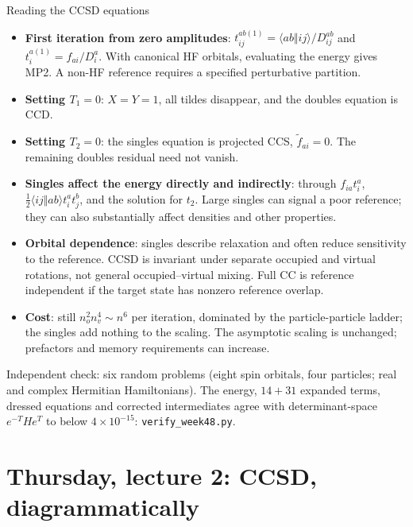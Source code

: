 \documentclass[aspectratio=169,10pt]{beamer}
\newcommand{\numbox}[1]{%
  \begin{tcolorbox}[colback=palegreen,colframe=teal!70!black,title={\bfseries Measured}]
  #1
  \end{tcolorbox}}
\newcommand{\as}[4]{\langle #1#2\Vert #3#4\rangle}
\newcommand{\ft}{\tilde f}
\begin{document}
\begin{frame}[shrink=10]{Reading the CCSD equations}
\small
\begin{itemize}
\item \textbf{First iteration from zero amplitudes}: $t_{ij}^{ab(1)}=\as abij/D_{ij}^{ab}$ and $t_i^{a(1)}=f_{ai}/D_i^a$. With canonical HF orbitals, evaluating the energy gives MP2. A non-HF reference requires a specified perturbative partition.
\item \textbf{Setting $T_1=0$}: $X=Y=1$, all tildes disappear, and the doubles equation is CCD.
\item \textbf{Setting $T_2=0$}: the singles equation is projected CCS, $\ft_{ai}=0$. The remaining doubles residual need not vanish.
\item \textbf{Singles affect the energy directly and indirectly}: through $f_{ia}t_i^a$, $\tfrac12\as ijab t_i^at_j^b$, and the solution for $t_2$. Large singles can signal a poor reference; they can also substantially affect densities and other properties.
\item \textbf{Orbital dependence}: singles describe relaxation and often reduce sensitivity to the reference. CCSD is invariant under separate occupied and virtual rotations, not general occupied--virtual mixing. Full CC is reference independent if the target state has nonzero reference overlap.
\item \textbf{Cost}: still $n_o^2n_v^4\sim n^6$ per iteration, dominated by the particle-particle ladder; the singles add nothing to the scaling. The asymptotic scaling is unchanged; prefactors and memory requirements can increase.
\end{itemize}
\numbox{Independent check: six random problems (eight spin orbitals, four particles; real and complex Hermitian Hamiltonians). The energy, $14+31$ expanded terms, dressed equations and corrected intermediates agree with determinant-space $e^{-T}He^T$ to below $4\times10^{-15}$: \texttt{verify\_week48.py}.}
\end{frame}

\section[Thursday 2: CCSD, diagrams]{Thursday, lecture 2: CCSD, diagrammatically}
\end{document}
